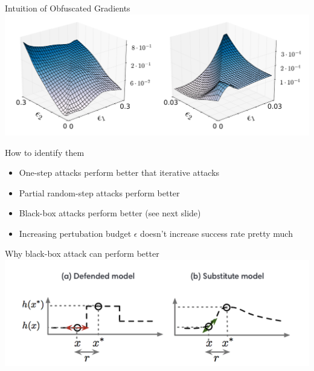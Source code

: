 \documentclass{beamer}
\begin{document}
\begin{frame}{Intuition of Obfuscated Gradients}
  \includegraphics[width=\textwidth]{fig/ob-grad/effect-of-gradient-masking.png}

\end{frame}

\begin{frame}{How to identify them}
  \begin{itemize}
    \item One-step attacks perform better that iterative attacks
    \item Partial random-step attacks perform better
    \item Black-box attacks perform better (see next slide)
    \item Increasing pertubation budget $\epsilon$ doesn't increase success rate pretty much
  \end{itemize}
\end{frame}

\begin{frame}{Why black-box attack can perform better}
  \includegraphics[width=\textwidth]{fig/ob-grad/black-box-attack.png}
\end{frame}
\end{document}
